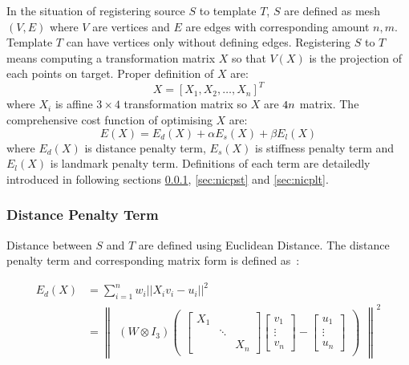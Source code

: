 In the situation of registering source $S$ to template $T$, $S$ are defined as mesh $(V,E)$ where $V$ are vertices and $E$ are edges with corresponding amount $n, m$. Template $T$ can have vertices only without defining edges. Registering $S$ to $T$ means computing a transformation matrix $X$ so that $V(X)$ is the projection of each points on target. Proper definition of $X$ are:
\begin{equation}
\label{eq:nicpX}
X=[X_1,X_2,\dotsc,X_n]^T
\end{equation}
where $X_i$ is affine $3\times 4$ transformation matrix so $X$ are $4n\time 3$ matrix. The comprehensive cost function of optimising $X$ are:
\begin{equation}
E(X)=E_d(X)+\alpha E_s(X)+\beta E_l(X)
\end{equation}
where $E_d(X)$ is distance penalty term, $E_s(X)$ is stiffness penalty term and $E_l(X)$ is landmark penalty term. Definitions of each term are detailedly introduced in following sections \ref{sec:nicpdt}, \ref{sec:nicpst} and \ref{sec:nicplt}.

\subsubsection{Distance Penalty Term}
\label{sec:nicpdt}

Distance between $S$ and $T$ are defined using Euclidean Distance. The distance penalty term and corresponding matrix form is defined as~\cite{Amberg2007}:

\begin{align}
\label{eq:nicpdt}
E_d(X) &= \sum_{i=1}^n{w_i || X_i v_i - u_i ||^2} 
\\ &=
\begin{Vmatrix}
    (W \otimes I_3) 
    \begin{pmatrix}
        \begin{bmatrix}
        X_1 &  &  \\  & \ddots &  \\ &  & X_n
        \end{bmatrix}
        \begin{bmatrix}
        v_1 \\ \vdots \\ v_n
        \end{bmatrix}
        -
        \begin{bmatrix}
        u_1 \\ \vdots \\ u_n
        \end{bmatrix}
    \end{pmatrix}
\end{Vmatrix}
^2
\end{align}

